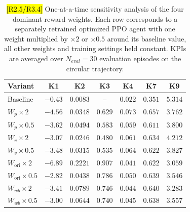 \documentclass{ieeeaccess}
\newcommand{\hloverlap}[1]{{\sethlcolor{roverlap}\hl{#1}}}
\begin{document}
\begin{table}[!t]
    \centering
    \caption{\hloverlap{[R2.5/R3.4]} One-at-a-time sensitivity analysis of the four dominant reward weights. Each row corresponds to
    a separately retrained optimized PPO agent with one weight multiplied by $\times 2$ or $\times 0.5$ around its baseline value,
    all other weights and training settings held constant. KPIs are averaged over $N_{eval}=30$ evaluation episodes on the circular
    trajectory.}
    \label{tab:reward_sensitivity}
    \renewcommand{\arraystretch}{1.2}
    \setlength{\tabcolsep}{3pt}
    \begin{tabular}{lcccccc}
        \toprule
        \textbf{Variant} & \textbf{K1} & \textbf{K2} & \textbf{K3} & \textbf{K4} & \textbf{K7} & \textbf{K9} \\
        \midrule
        Baseline                            & $\mathbf{-0.43}$ & $\mathbf{0.0083}$ & --                & $\mathbf{0.022}$ & $\mathbf{0.351}$ & $5.314$ \\
        $W_p \times 2$                      & $-4.56$          & $0.0348$          & $0.629$           & $0.073$          & $0.657$          & $3.762$ \\
        $W_p \times 0.5$                    & $-3.62$          & $0.0494$          & $0.583$           & $0.059$          & $0.611$          & $3.800$ \\
        $W_v \times 2$                      & $-3.07$          & $0.0246$          & $\mathbf{0.480}$  & $0.061$          & $0.634$          & $4.212$ \\
        $W_v \times 0.5$                    & $-3.48$          & $0.0315$          & $0.535$           & $0.064$          & $0.622$          & $3.827$ \\
        $W_{\mathrm{ori}} \times 2$         & $-6.89$          & $0.2221$          & $0.907$           & $0.041$          & $0.622$          & $3.059$ \\
        $W_{\mathrm{ori}} \times 0.5$       & $-2.82$          & $0.0438$          & $0.786$           & $0.050$          & $0.639$          & $3.546$ \\
        $W_{wb} \times 2$                   & $-3.41$          & $0.0789$          & $0.746$           & $0.044$          & $0.640$          & $3.283$ \\
        $W_{wb} \times 0.5$                 & $-3.00$          & $0.0644$          & $0.740$           & $0.045$          & $0.638$          & $3.557$ \\
        \bottomrule
    \end{tabular}
\end{table}
\end{document}

